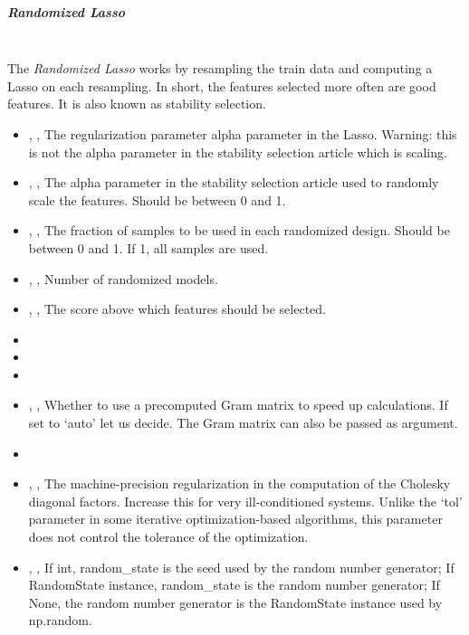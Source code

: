 \subparagraph{Randomized Lasso}
\mbox{}
\\The \textit{Randomized Lasso} works by resampling the train data and computing
a Lasso on each resampling.
%
In short, the features selected more often are good features.
%
It is also known as stability selection.
%
\begin{itemize}
  \item {} , ,
  The regularization parameter alpha parameter in the Lasso.
  Warning: this is not the alpha parameter in the stability selection article
  which is scaling.
  \item {} , ,
  The alpha parameter in the stability selection article used to randomly scale
  the features.
  Should be between 0 and 1.
  \item {} , ,
  The fraction of samples to be used in each randomized design.
  Should be between 0 and 1.
  If 1, all samples are used.
  \item {} , ,
  Number of randomized models.
  \item {} , ,
  The score above which features should be selected.
  \item {}
  \item \verDescriptionB
  \item {}
  \item {} , ,
  Whether to use a precomputed Gram matrix to speed up calculations.
  If set to ‘auto’ let us decide.
  The Gram matrix can also be passed as argument.
  \item \maxIterDescription{}
  \item {} , ,
  The machine-precision regularization in the computation of the Cholesky
  diagonal factors.
  Increase this for very ill-conditioned systems.
  Unlike the ‘tol’ parameter in some iterative optimization-based
  algorithms, this parameter does not control the tolerance of the optimization.
  \item {} , ,
  If int, random\_state is the seed used by the random number
  generator; If RandomState instance, random\_state is the random
  number generator; If None, the random number generator is the RandomState
  instance used by np.random.
\end{itemize}

